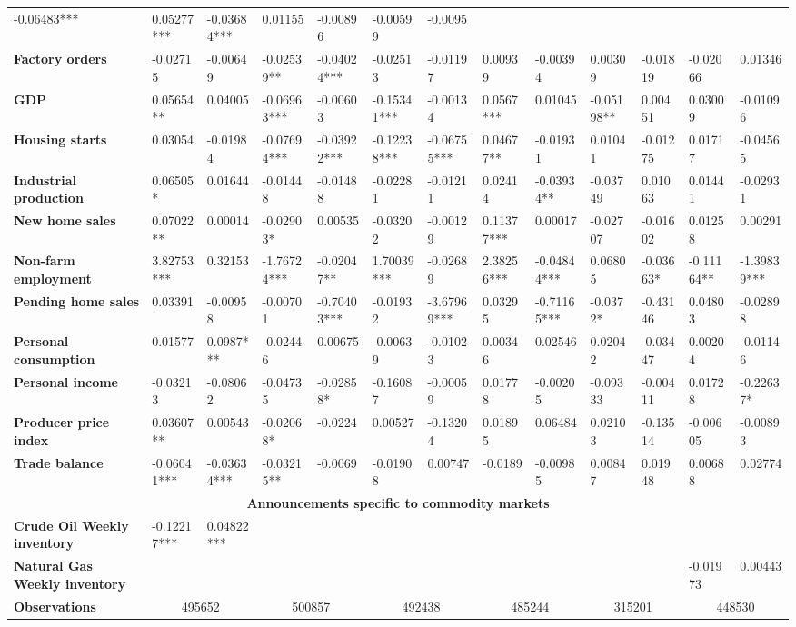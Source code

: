\begin{sidewaystable}
{\begin{tabular}{@{}lllllllllllll@{}}
-0.06483*** & 0.05277*** & -0.03684*** & 0.01155 & -0.00896 & -0.00599 & -0.0095 \\ \textbf{Factory orders}& -0.02715 & -0.00649 & -0.02539** & -0.04024*** & -0.02513 & -0.01197 & 0.00939 & -0.00394 & 0.00309 & -0.01819 & -0.02066 & 0.01346 \\ \textbf{GDP}& 0.05654** & 0.04005 & -0.06963*** & -0.00603 & -0.15341*** & -0.00134 & 0.0567*** & 0.01045 & -0.05198** & 0.00451 & 0.03009 & -0.01096 \\ \textbf{Housing starts}& 0.03054 & -0.01984 & -0.07694*** & -0.03922*** & -0.12238*** & -0.06755*** & 0.04677** & -0.01931 & 0.01041 & -0.01275 & 0.01717 & -0.04565 \\ \textbf{Industrial production}& 0.06505* & 0.01644 & -0.01448 & -0.01488 & -0.02281 & -0.01211 & 0.02414 & -0.03934** & -0.03749 & 0.01063 & 0.01441 & -0.02931 \\ \textbf{New home sales}& 0.07022** & 0.00014 & -0.02903* & 0.00535 & -0.03202 & -0.00129 & 0.11377*** & 0.00017 & -0.02707 & -0.01602 & 0.01258 & 0.00291 \\ \textbf{Non-farm employment}& 3.82753*** & 0.32153 & -1.76724*** & -0.02047** & 1.70039*** & -0.02689 & 2.38256*** & -0.04844*** & 0.06805 & -0.03663* & -0.11164** & -1.39839*** \\ \textbf{Pending home sales}& 0.03391 & -0.00958 & -0.00701 & -0.70403*** & -0.01932 & -3.67969*** & 0.03295 & -0.71165*** & -0.0372* & -0.43146 & 0.04803 & -0.02898 \\ \textbf{Personal consumption}& 0.01577 & 0.0987*** & -0.02446 & 0.00675 & -0.00639 & -0.01023 & 0.00346 & 0.02546 & 0.02042 & -0.03447 & 0.00204 & -0.01146 \\ \textbf{Personal income}& -0.03213 & -0.08062 & -0.04735 & -0.02858* & -0.16087 & -0.00059 & 0.01778 & -0.00205 & -0.09333 & -0.00411 & 0.01728 & -0.22637* \\ \textbf{Producer price index}& 0.03607** & 0.00543 & -0.02068* & -0.0224 & 0.00527 & -0.13204 & 0.01895 & 0.06484 & 0.02103 & -0.13514 & -0.00605 & -0.00893 \\ \textbf{Trade balance}& -0.06041*** & -0.03634*** & -0.03215** & -0.0069 & -0.01908 & 0.00747 & -0.0189 & -0.00985 & 0.00847 & 0.01948 & 0.00688 & 0.02774 \\  \midrule \multicolumn{13}{c}{\textbf{Announcements specific to commodity markets}} \\ \midrule \textbf{Crude Oil Weekly inventory}& -0.12217*** & 0.04822*** &  &  &  &  &  &  &  &  &  &  \\ \textbf{Natural Gas Weekly inventory}&  &  &  &  &  &  &  &  &  &  & -0.01973 & 0.00443 \\  \midrule \textbf{Observations}             &\multicolumn{2}{c}{ 495652 }                                                 & \multicolumn{2}{c}{ 500857 }                                                 & \multicolumn{2}{c}{ 492438 }                                                 & \multicolumn{2}{c}{ 485244 }                                                 & \multicolumn{2}{c}{ 315201 }                                                   & \multicolumn{2}{c}{ 448530 }      
\end{tabular}}
\end{sidewaystable}
